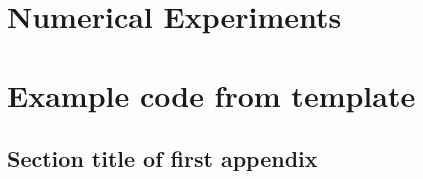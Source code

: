 \documentclass[pdflatex,sn-basic]{template/sn-jnl}%
\begin{document}
\section{Numerical Experiments}



\section{Example code from template}





\begin{appendices}
	
\section{Section title of first appendix}\label{secA1}


\end{appendices}



\end{document}
